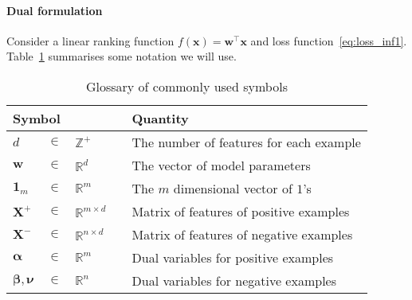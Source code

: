 \documentclass[9pt]{extarticle}
\newcommand{\x}{\mathbf{x}}
\newcommand{\X}{\mathbf{X}}
\newcommand{\1}{\mathbf{1}}
\newcommand{\w}{\mathbf{w}}
\newcommand{\R}{\mathbb{R}}
\newcommand{\Z}{\mathbb{Z}}
\newcommand{\alphabm}{\bm{\alpha}}
\newcommand{\betabm}{\bm{\beta}}
\newcommand{\nubm}{\bm{\nu}}
\begin{document}
\paragraph{Dual formulation}
Consider a linear ranking function $f(\x) = \w^\top \x$ and loss function~\ref{eq:loss_inf1}.
Table~\ref{tab:symbol} summarises some notation we will use.
\begin{table}[!h]
\caption{Glossary of commonly used symbols}
\label{tab:symbol}
\renewcommand{\arraystretch}{1.5} %
\setlength{\tabcolsep}{1pt} %
\centering
\begin{tabular}{llll}
\hline \hline
\multicolumn{3}{l}{\textbf{Symbol}} & \textbf{Quantity} \\ \hline 
$d$              &  $\in$  &  $\Z^+$  & The number of features for each example \\
$\w$             &  $\in$  &  $\R^d$  & The vector of model parameters \\
$\mathbf{1}_m$   &  $\in$  &  $\R^m$  & The $m$ dimensional vector of $1$'s \\
$\X^+$           &  $\in$  &  $\R^{m \times d}\quad$  & Matrix of features of positive examples \\
$\X^-$           &  $\in$  &  $\R^{n \times d}$       & Matrix of features of negative examples \\
$\alphabm$       &  $\in$  &  $\R^m$  &  Dual variables for positive examples \\
$\betabm, \nubm$ &  $\in$  &  $\R^n$  &  Dual variables for negative examples \\ \hline
\end{tabular}
\end{table}
\end{document}

